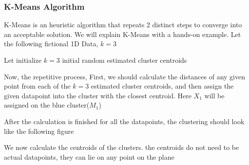 \documentclass[11pt]{article}
\begin{document}
			\subsubsection*{K-Means Algorithm}
				K-Means is an heuristic algorithm that repeats 2 distinct steps to converge into an acceptable solution. We will explain K-Means with a hands-on example.
				Let the following fictional 1D Data, $k=3$

				Let initialize $k=3$ initial random estimated cluster centroids

				Now, the repetitive process, First, we should calculate the distances of any given point from each of the $k=3$ 
				estimated cluster centroids, and then assign the given datapoint into the cluster with the closest centroid. Here $X_1$ will be 
				assigned on the blue cluster($M_1$)

				After the calculation is finished for all the datapoints, the clustering should look like the following figure

				We now calculate the centroids of the clusters. the centroids do not need to be actual datapoints, they can lie on any point on the plane
\end{document}
